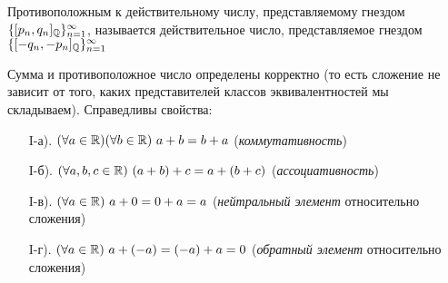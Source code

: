 \begin{definition}
    Противоположным к действительному числу,
    представляемому гнездом $\{[p_n, q_n]_{\mathbb{Q}}\}_{n = 1}^{\infty}$,
    называется действительное число, представляемое гнездом
    $\{[-q_n, -p_n]_{\mathbb{Q}}\}_{n = 1}^{\infty}$ 
\end{definition}

\begin{theorem}
    Сумма и противоположное число определены
    корректно (то есть сложение не зависит от того,
    каких представителей классов эквивалентностей мы
    складываем). Справедливы свойства:

    \begin{enumerate}
        \item[I-а).]  $(\forall a \in \mathbb{R})(\forall b \in \mathbb{R})
            \ a + b = b + a$ (\textit{коммутативность})
        \item[I-б).]  $(\forall a, b, c \in \mathbb{R})
            \ (a + b) + c = a +(b + c)$ (\textit{ассоциативность})
        \item[I-в).]  $(\forall a \in \mathbb{R})
            \ a + 0 = 0 + a = a$ (\textit{нейтральный элемент} относительно сложения)
        \item[I-г).] $(\forall a \in \mathbb{R})
            \ a + (-a) = (-a) + a = 0$ (\textit{обратный элемент} относительно сложения)
    \end{enumerate}
\end{theorem}

